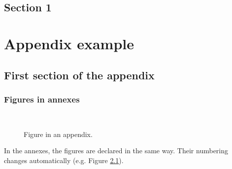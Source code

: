 \documentclass[letterpaper%
, twoside%
, 12pt%
,these%
, english%
,creativecommons,hyperref%
]{thETS}
\begin{document}
\section{Section 1}

\lipsum[1] %

\begin{conclusion}

\lipsum[1] %

\end{conclusion}


\appendix

\multiannexe

% 

\chapter{Appendix example} 


\section{First section of the appendix}


\subsection{Figures in annexes}

\begin{figure}
	\centering
	 \\ \parbox{0.75\textwidth}{\caption{Figure in an appendix.}\label{fig:testAp}}
\end{figure}

In the annexes, the figures are declared in the same way. Their numbering changes automatically (e.g. Figure \ref{fig:testAp}).
\end{document}
